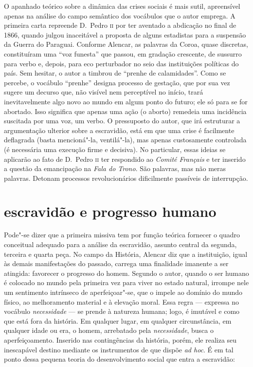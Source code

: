 O apanhado teórico sobre a dinâmica das crises sociais é mais sutil,
apreensível apenas na análise do campo semântico dos vocábulos que o
autor emprega. A primeira carta repreende D.~Pedro \textsc{ii} por ter aventado
a abdicação no final de 1866, quando julgou inaceitável a proposta de
alguns estadistas para a suspensão da Guerra do Paraguai. Conforme
Alencar, as palavras da Coroa, quase discretas, constituíram uma ``voz
funesta'' que passou, em gradação crescente, de sussurro para verbo e,
depois, para eco perturbador no seio das instituições políticas do
país. Sem hesitar, o autor a timbrou de ``prenhe de calamidades''. Como
se percebe, o vocábulo ``prenhe'' designa processo de gestação, que por
sua vez sugere um decurso que, não visível nem perceptível no início,
trará inevitavelmente algo novo ao mundo em algum ponto do futuro; ele
só para se for abortado. Isso significa que apenas uma ação (o aborto)
remedeia uma incidência suscitada por uma voz, um verbo. O pressuposto
do autor, que irá estruturar a argumentação ulterior sobre a
escravidão, está em que uma crise é facilmente deflagrada (basta
mencioná"-la, ventilá"-la), mas apenas custosamente controlada (é
necessária uma execução firme e decisiva). No particular, essas ideias
se aplicarão ao fato de D.~Pedro \textsc{ii} ter respondido ao \textit{Comité
Français} e ter inserido a questão da emancipação na \textit{Fala do
Trono}. São palavras, mas não meras palavras. Detonam processos
revolucionários dificilmente passíveis de interrupção.  

\section{escravidão e progresso humano} 

Pode"-se dizer que a primeira missiva tem por função teórica fornecer o
quadro conceitual adequado para a análise da escravidão, assunto
central da segunda, terceira e quarta peça. No campo da História,
Alencar diz que a instituição, igual às demais manifestações do
passado, carrega uma finalidade imanente a ser atingida: favorecer o
progresso do homem. Segundo o autor, quando o ser humano é colocado no
mundo pela primeira vez para viver no estado natural, irrompe nele um
sentimento intrínseco de aperfeiçoar"-se, que o impele ao domínio do
mundo físico, ao melhoramento material e à  elevação moral. Essa regra ---
expressa no vocábulo \textit{necessidade} --- se prende à  natureza
humana; logo, é imutável e como que está fora da história. Em qualquer
lugar, em qualquer circunstância, em \mbox{qualquer} idade ou era, o homem,
arrebatado pela \textit{necessidade}, busca o aperfeiçoamento. Inserido
nas contingências da história, porém, ele realiza seu inescapável
destino mediante os instrumentos de que dispõe \textit{ad hoc}. É em
tal ponto dessa pequena teoria do desenvolvimento social que entra a escravidão: 

